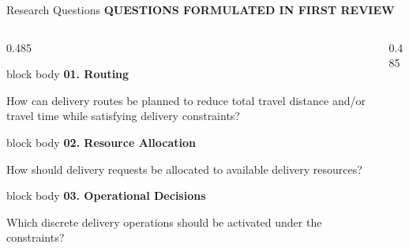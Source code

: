 \documentclass[aspectratio=169,10pt]{beamer}
\newcommand{\sectiontag}[1]{%
    {\scriptsize\bfseries\color{Accent}\MakeUppercase{#1}}\par\vspace{0.08cm}
}
\begin{document}
\begin{frame}{Research Questions}
\sectiontag{Questions Formulated in First Review}

\vspace{-0.15cm}

\begin{columns}[T,totalwidth=\textwidth]

    \begin{column}{0.485\textwidth}
        
        \begin{beamercolorbox}[rounded=true,shadow=false,wd=\linewidth,sep=3.5pt]{block body}
            {\bfseries\color{Primary}\scriptsize 01. Routing}\par\vspace{0.02cm}
            \footnotesize How can delivery routes be planned to reduce total travel distance and/or travel time while satisfying delivery constraints?
        \end{beamercolorbox}
        
        \vspace{0.15cm}
        
        \begin{beamercolorbox}[rounded=true,shadow=false,wd=\linewidth,sep=3.5pt]{block body}
            {\bfseries\color{Primary}\scriptsize 02. Resource Allocation}\par\vspace{0.02cm}
            \footnotesize How should delivery requests be allocated to available delivery resources?
        \end{beamercolorbox}
        
        \vspace{0.15cm}
        
        \begin{beamercolorbox}[rounded=true,shadow=false,wd=\linewidth,sep=3.5pt]{block body}
            {\bfseries\color{Primary}\scriptsize 03. Operational Decisions}\par\vspace{0.02cm}
            \footnotesize Which discrete delivery operations should be activated under the constraints?
        \end{beamercolorbox}

    \end{column}

    \begin{column}{0.485\textwidth}


\end{column}
\end{columns}
\end{frame}
\end{document}

